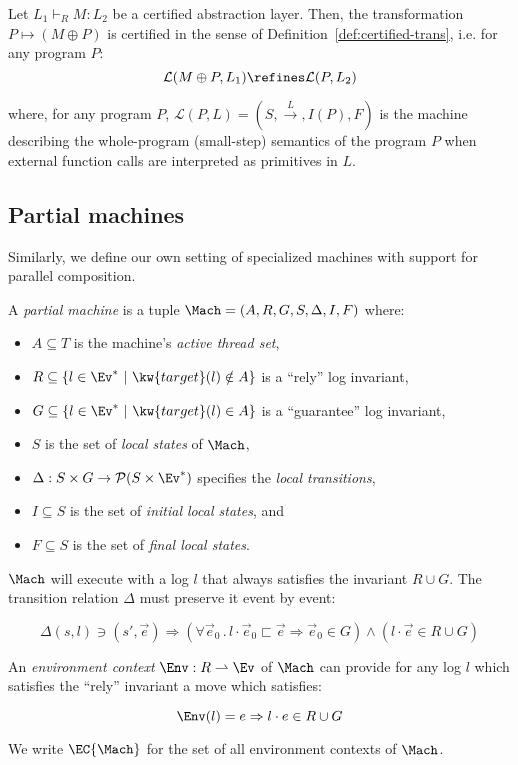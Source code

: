\begin{theorem}
Let $L_1 \vdash_R M : L_2$ be a certified abstraction layer. Then, the
transformation $P \mapsto (M \oplus P)$ is certified in the sense of
Definition~\ref{def:certified-trans}, i.e. for any program $P$:
\[ \mathcal{L}(M \oplus P, L_1) \refines \mathcal{L}(P, L_2) \]
\end{theorem}
\noindent where, for any program 
{\small $P$, $\mathcal{L}(P, L) = (S,
\stackrel{L}{\rightarrow}, I(P), F)$} is the machine describing the
whole-program (small-step) semantics of the program $P$ when external
function calls are interpreted as primitives in $L$.

\subsection{Partial machines}

Similarly,
we define our own setting of specialized machines
with support for parallel composition.

\begin{definition}
\label{def:partialm}
A \emph{partial machine} is a tuple $\Mach = (A, R, G, S, \Delta, I, F)$
where:
\begin{itemize}
\item
$A \subseteq T$ is the machine's \emph{active thread set},
\item
$R \subseteq \{ l \in \Ev^* \ |\ \kw{target}(l) \notin A \}$ is a ``rely'' log invariant,
\item
$G \subseteq \{ l \in \Ev^* \ |\ \kw{target}(l) \in A \}$ is a ``guarantee'' log invariant,
\item
$S$ is the set of \emph{local states} of $\Mach$,
\item
$\Delta : S \times G \rightarrow \mathcal{P}(S \times \Ev^*)$
specifies the \emph{local transitions},
\item
$I \subseteq S$ is the set of \emph{initial local states}, and
\item
$F \subseteq S$ is the set of \emph{final local states}.
\end{itemize}
$\Mach$ will execute with a log $l$ that always satisfies the invariant $R \cup G$.
The transition relation $\Delta$ must preserve it event by event:
\begin{small}
\[ \Delta(s, l) \ni (s', \vec{e}) \Rightarrow (\forall \vec{e}_0 \,.\, l \cdot \vec{e}_0 \sqsubset \vec{e} \Rightarrow \vec{e}_0 \in G) \wedge (l \cdot \vec{e} \in R \cup G) \]
\end{small}%
An \emph{environment context} $\Env : R \rightharpoonup \Ev$
of $\Mach$ can provide for any log $l$
which satisfies the ``rely'' invariant
a move which satisfies:
\begin{small}
\[ \Env(l) = e \Rightarrow l \cdot e \in R \cup G \]
\end{small}%
We write $\EC{\Mach}$ for the set of all environment contexts of $\Mach$.
\end{definition}

